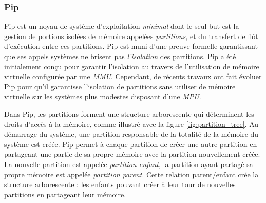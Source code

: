 			\subsubsection{Pip}
	\label{sec:pip}

	Pip est un noyau de système d'exploitation \emph{minimal} dont le seul but est la gestion de portions isolées de mémoire appelées \emph{partitions}, et du transfert de flôt d'exécution entre ces partitions. Pip est muni d'une preuve formelle garantissant que ses appels systèmes ne brisent pas \emph{l'isolation} des partitions. Pip a été initialement conçu pour garantir l'isolation au travers de l'utilisation de mémoire virtuelle configurée par une \emph{MMU}. Cependant, de récents travaux \cite{dejon2022mmu} ont fait évoluer Pip pour qu'il garantisse l'isolation de partitions sans utiliser de mémoire virtuelle sur les systèmes plus modestes disposant d'une \emph{MPU}.

	Dans Pip, les partitions forment une structure arborescente qui déterminent les droits d'accès à la mémoire, comme illustré avec la figure \ref{fig:partition_tree}. Au démarrage du système, une partition responsable de la totalité de la mémoire du système est créée. Pip permet à chaque partition de créer une autre partition en partageant une partie de sa propre mémoire avec la partition nouvellement créée. La nouvelle partition est appelée \emph{partition enfant}, la partition ayant partagé sa propre mémoire est appelée \emph{partition parent}. Cette relation parent/enfant crée la structure arborescente : les enfants pouvant créer à leur tour de nouvelles partitions en partageant leur mémoire.

	\begin{figure}[!ht]
	\end{figure}

	

